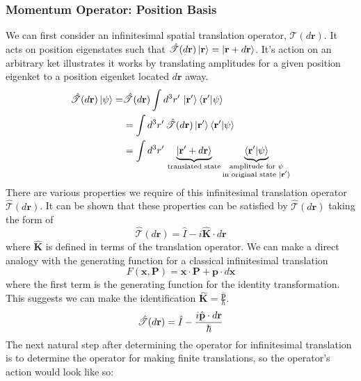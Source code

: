 \documentclass[12pt]{article}
\numberwithin{equation}{section}
\begin{document}
\subsubsection{Momentum Operator: Position Basis}
We can first consider an infinitesimal spatial translation operator, $\hat{\mathscr{T}}(d\textbf{r})$. It acts on position eigenstates such that $\hat{\mathscr{T}}(d\textbf{r})\ket{\textbf{r}} = \ket{\textbf{r} + d\textbf{r}}$. It's action on an arbitrary ket illustrates it works by translating amplitudes for a given position eigenket to a position eigenket located $d\textbf{r}$ away.
\begin{align}
    \hat{\mathscr{T}}(d\textbf{r})\ket{\psi} =& \hat{\mathscr{T}}(d\textbf{r}) \int d^3r' \, \ket{\textbf{r}'}\braket{\textbf{r}' | \psi}\\
    &= \int d^3r' \, \hat{\mathscr{T}}(d\textbf{r}) \ket{\textbf{r}'}\braket{\textbf{r}' | \psi}\\
    &= \int d^3r' \, \underbrace{\ket{\textbf{r}' + d\textbf{r}}}_{\substack{\text{translated state}}}\underbrace{\braket{\textbf{r}' | \psi}}_{\substack{\text{amplitude for } \psi \\\text{in original state } \ket{\textbf{r}'}}}
\end{align}
There are various properties we require of this infinitesimal translation operator $\hat{\mathscr{T}}(d\textbf{r})$. It can be shown that these properties can be satisfied by $\hat{\mathscr{T}}(d\textbf{r})$ taking the form of
\begin{equation}
    \hat{\mathscr{T}}(d\textbf{r}) = \hat{I} - i\hat{\textbf{K}} \cdot d\textbf{r}
\end{equation}
where $\hat{\textbf{K}}$ is defined in terms of the translation operator. We can make a direct analogy with the generating function for a classical infinitesimal translation
\begin{equation}
    F(\textbf{x}, \textbf{P}) = \textbf{x} \cdot \textbf{P} + \textbf{p} \cdot d\textbf{x} 
\end{equation}
where the first term is the generating function for the identity transformation. This suggests we can make the identification $\hat{\textbf{K}} = \frac{\hat{\textbf{p}}}{\hbar}$.
\begin{equation}
    \hat{\mathscr{T}}(d\textbf{r}) = \hat{I} - \frac{i \hat{\textbf{p}} \cdot d\textbf{r}}{\hbar}\\
\end{equation}
The next natural step after determining the operator for infinitesimal translation is to determine the operator for making finite translations, so the operator's action would look like so:
\end{document}
